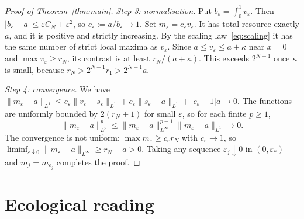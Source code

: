 \documentclass[11pt]{article}
\theoremstyle{remark}
\begin{document}
\begin{proof}[Proof of Theorem~\ref{thm:main}]
\emph{Step 3: normalisation.} Put \(b_\varepsilon=\int_0^1v_\varepsilon\).
Then \(|b_\varepsilon-a|\le\varepsilon C_N+\varepsilon^2\), so
\(c_\varepsilon:=a/b_\varepsilon\to1\). Set
\(m_\varepsilon=c_\varepsilon v_\varepsilon\). It has total resource
exactly \(a\), and it is positive and strictly increasing. By the scaling
law~\eqref{eq:scaling} it has the same number of strict local maxima as
\(v_\varepsilon\). Since \(a\le v_\varepsilon\le a+\kappa\) near \(x=0\) and
\(\max v_\varepsilon\ge r_N\), its contrast is at least \(r_N/(a+\kappa)\). This
exceeds \(2^{N-1}\) once \(\kappa\) is small, because
\(r_N>2^{N-1}r_1>2^{N-1}a\).

\emph{Step 4: convergence.} We have
\(\|m_\varepsilon-a\|_{L^1}\le c_\varepsilon\|v_\varepsilon-s_\varepsilon\|_{L^1}
+c_\varepsilon\|s_\varepsilon-a\|_{L^1}+|c_\varepsilon-1|a\to0\). The
functions are uniformly bounded by \(2(r_N+1)\) for small \(\varepsilon\),
so for each finite \(p\geq1\),
\[
 \|m_\varepsilon-a\|_{L^p}^p
 \leq \|m_\varepsilon-a\|_{L^\infty}^{p-1}
       \|m_\varepsilon-a\|_{L^1}\longrightarrow0.
\]
The convergence is not uniform: \(\max m_\varepsilon\ge c_\varepsilon r_N\) with
\(c_\varepsilon\to1\), so
\(\liminf_{\varepsilon\downarrow0}\|m_\varepsilon-a\|_{L^\infty}\ge r_N-a>0\).
Taking any sequence \(\varepsilon_j\downarrow0\) in \((0,\varepsilon_*)\)
and \(m_j=m_{\varepsilon_j}\) completes the proof.
\end{proof}

\section{Ecological reading}\label{sec:ecology}
\end{document}
